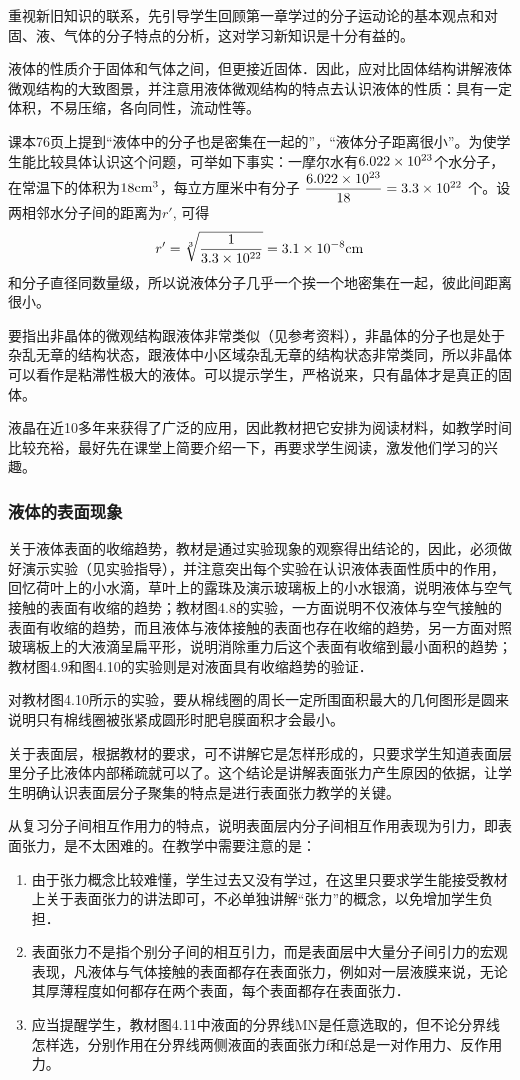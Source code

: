 重视新旧知识的联系，先引导学生回顾第一章学过的分子运动论的基本观点和对固、液、气体的分子特点的分析，这对学习新知识是十分有益的。

液体的性质介于固体和气体之间，但更接近固体．因此，应对比固体结构讲解液体微观结构的大致图景，并注意用液体微观结构的特点去认识液体的性质：具有一定体积，不易压缩，各向同性，流动性等。

课本76页上提到“液体中的分子也是密集在一起的”，“液体分子距离很小”。为使学生能比较具体认识这个问题，可举如下事实：一摩尔水有$6.022\times10^{23}$个水分子，在常温下的体积为$18{\rm cm^3}$，每立方厘米中有分子
$\dfrac{6.022\times10^{23}}{18}=3.3\times10^{22}$
个。设两相邻水分子间的距离为$r'$, 可得
\[r'=\sqrt[3]{\frac{1}{3.3\times10^{22}}}=3.1\times 10^{-8}{\rm cm}\]
和分子直径同数量级，所以说液体分子几乎一个挨一个地密集在一起，彼此间距离很小。

要指出非晶体的微观结构跟液体非常类似（见参考资料），非晶体的分子也是处于杂乱无章的结构状态，跟液体中小区域杂乱无章的结构状态非常类同，所以非晶体可以看作是粘滞性极大的液体。可以提示学生，严格说来，只有晶体才是真正的固体。

液晶在近10多年来获得了广泛的应用，因此教材把它安排为阅读材料，如教学时间比较充裕，最好先在课堂上简要介绍一下，再要求学生阅读，激发他们学习的兴趣。

\subsubsection{液体的表面现象}

关于液体表面的收缩趋势，教材是通过实验现象的观察得出结论的，因此，必须做好演示实验（见实验指导），并注意突出每个实验在认识液体表面性质中的作用，回忆荷叶上的小水滴，草叶上的露珠及演示玻璃板上的小水银滴，说明液体与空气接触的表面有收缩的趋势；教材图4.8的实验，一方面说明不仅液体与空气接触的表面有收缩的趋势，而且液体与液体接触的表面也存在收缩的趋势，另一方面对照玻璃板上的大液滴呈扁平形，说明消除重力后这个表面有收缩到最小面积的趋势；教材图4.9和图4.10的实验则是对液面具有收缩趋势的验证．

对教材图4.10所示的实验，要从棉线圈的周长一定所围面积最大的几何图形是圆来说明只有棉线圈被张紧成圆形时肥皂膜面积才会最小。

关于表面层，根据教材的要求，可不讲解它是怎样形成的，只要求学生知道表面层里分子比液体内部稀疏就可以了。这个结论是讲解表面张力产生原因的依据，让学生明确认识表面层分子聚集的特点是进行表面张力教学的关键。

从复习分子间相互作用力的特点，说明表面层内分子间相互作用表现为引力，即表面张力，是不太困难的。在教学中需要注意的是：
\begin{enumerate}
    \item 由于张力概念比较难懂，学生过去又没有学过，在这里只要求学生能接受教材上关于表面张力的讲法即可，不必单独讲解“张力”的概念，以免增加学生负担．
    \item 表面张力不是指个别分子间的相互引力，而是表面层中大量分子间引力的宏观表现，凡液体与气体接触的表面都存在表面张力，例如对一层液膜来说，无论其厚薄程度如何都存在两个表面，每个表面都存在表面张力．
    \item 应当提醒学生，教材图4.11中液面的分界线MN是任意选取的，但不论分界线怎样选，分别作用在分界线两侧液面的表面张力f和f总是一对作用力、反作用力。
\end{enumerate}

